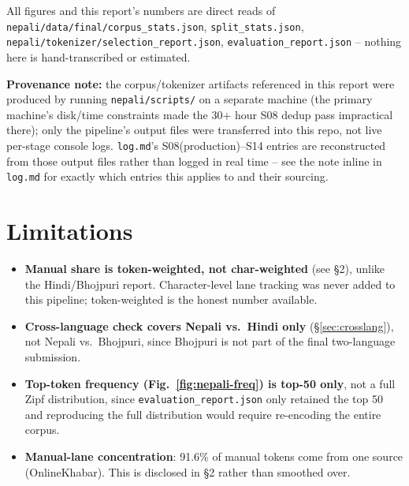 \documentclass[11pt]{article}
\begin{document}
All figures and this report's numbers are direct reads of
\texttt{nepali/data/final/corpus\_stats.json}, \texttt{split\_stats.json},
\texttt{nepali/tokenizer/selection\_report.json},
\texttt{evaluation\_report.json} -- nothing here is hand-transcribed or
estimated.

\textbf{Provenance note:} the corpus/tokenizer artifacts referenced in
this report were produced by running \texttt{nepali/scripts/} on a
separate machine (the primary machine's disk/time constraints made the
30+ hour S08 dedup pass impractical there); only the pipeline's output
files were transferred into this repo, not live per-stage console logs.
\texttt{log.md}'s S08(production)--S14 entries are reconstructed from
those output files rather than logged in real time -- see the note inline
in \texttt{log.md} for exactly which entries this applies to and their
sourcing.

\section{Limitations}

\begin{itemize}
\item \textbf{Manual share is token-weighted, not char-weighted} (see
\S2), unlike the Hindi/Bhojpuri report. Character-level lane tracking was
never added to this pipeline; token-weighted is the honest number
available.
\item \textbf{Cross-language check covers Nepali vs.\ Hindi only}
(\S\ref{sec:crosslang}), not Nepali vs.\ Bhojpuri, since Bhojpuri is not
part of the final two-language submission.
\item \textbf{Top-token frequency (Fig.~\ref{fig:nepali-freq}) is top-50
only}, not a full Zipf distribution, since \texttt{evaluation\_report.json}
only retained the top 50 and reproducing the full distribution would
require re-encoding the entire corpus.
\item \textbf{Manual-lane concentration}: 91.6\% of manual tokens come
from one source (OnlineKhabar). This is disclosed in \S2 rather than
smoothed over.
\end{itemize}
\end{document}
